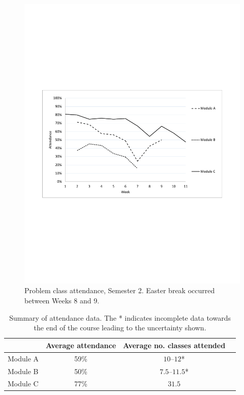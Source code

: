 \documentclass{amsart}
\begin{document}
\begin{center}
\begin{figure}[hbt]
\includegraphics[bb=50 250 562 545,width=1\textwidth]{figure3.pdf}
\caption{Problem class attendance, Semester 2. Easter break occurred between Weeks 8 and 9.}
\end{figure}
\end{center}

\begin{table}[htb]
\begin{tabular}{lccc}
& Average attendance & Average no. classes attended\\\hline
Module A & 59\% & $10$--$12$*\\
Module B & 50\% & $7.5$--$11.5$*\\
Module C & 77\% & $31.5$
\end{tabular}
\caption{Summary of attendance data. The * indicates incomplete data towards the end of the course leading to the uncertainty shown.}
\end{table}
\end{document}

